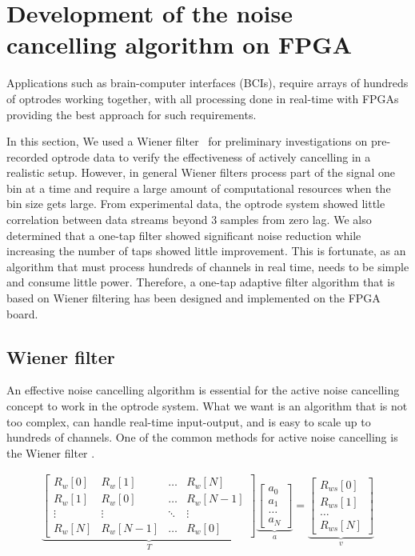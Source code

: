 \section{Development of the noise cancelling algorithm on FPGA}

Applications such as brain-computer interfaces (BCIs), require arrays of hundreds of optrodes working together, with all processing done in real-time with FPGAs providing the best approach for such requirements.

In this section, We used a Wiener filter~\cite{WienerFilter} for preliminary investigations on pre-recorded optrode data to verify the effectiveness of actively cancelling in a realistic setup. However, in general Wiener filters process part of the signal one bin at a time and require a large amount of computational resources when the bin size gets large.  From experimental data, the optrode system showed little correlation between data streams beyond 3 samples from zero lag. We also determined that a one-tap filter showed significant noise reduction while increasing the number of taps showed little improvement.  This is fortunate, as an algorithm that must process hundreds of channels in real time, needs to be simple and consume little power.  Therefore, a one-tap adaptive filter algorithm that is based on Wiener filtering has been designed and implemented on the FPGA board.

\subsection{Wiener filter}

An effective noise cancelling algorithm is essential for the active noise cancelling concept to work in the optrode system.  What we want is an algorithm that is not too complex, can handle real-time input-output, and is easy to scale up to hundreds of channels.  One of the common methods for active noise cancelling is the Wiener filter \cite{WienerPaper}. 

\begin{gather} \label{eqn_WienerMatrix_2}
\underbrace{
    \begin{bmatrix}
    R_w[0] & R_w[1] & \dots & R_w[N] \\
    R_w[1] & R_w[0] & \dots & R_w[N-1] \\
    \vdots & \vdots & \ddots & \vdots \\
    R_w[N] & R_w[N-1] & \dots & R_w[0]
    \end{bmatrix}
}_{T}
\underbrace{
    \begin{bmatrix}
    a_0 \\
    a_1 \\
    \dots \\
    a_N
    \end{bmatrix}
}_{a}
=
\underbrace{
    \begin{bmatrix}
    R_{ws}[0] \\
    R_{ws}[1] \\
    \dots \\
    R_{ws}[N]
    \end{bmatrix}
}_{v}
\end{gather}

